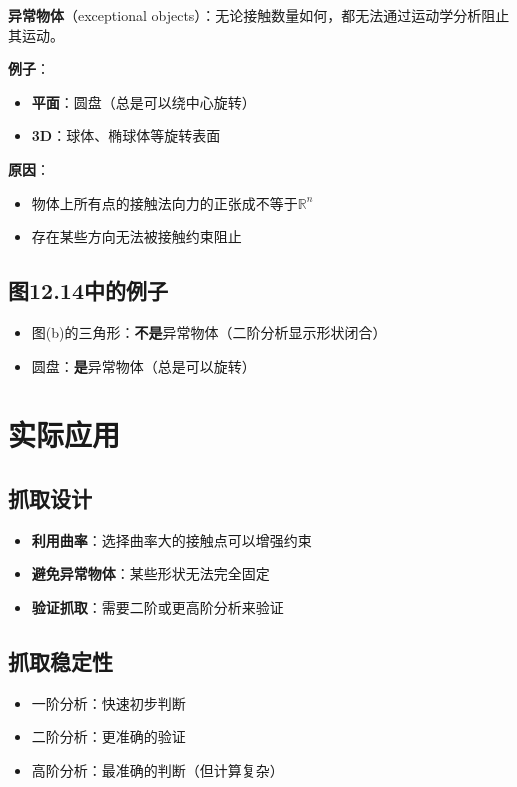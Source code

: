 \documentclass[12pt,a4paper]{article}
\begin{document}
\textbf{异常物体}（exceptional objects）：无论接触数量如何，都无法通过运动学分析阻止其运动。

\textbf{例子}：
\begin{itemize}
\item \textbf{平面}：圆盘（总是可以绕中心旋转）
\item \textbf{3D}：球体、椭球体等旋转表面
\end{itemize}

\textbf{原因}：
\begin{itemize}
\item 物体上所有点的接触法向力的正张成不等于$\mathbb{R}^n$
\item 存在某些方向无法被接触约束阻止
\end{itemize}

\subsection{图12.14中的例子}

\begin{itemize}
\item 图(b)的三角形：\textbf{不是}异常物体（二阶分析显示形状闭合）
\item 圆盘：\textbf{是}异常物体（总是可以旋转）
\end{itemize}

\section{实际应用}

\subsection{抓取设计}

\begin{itemize}
\item \textbf{利用曲率}：选择曲率大的接触点可以增强约束
\item \textbf{避免异常物体}：某些形状无法完全固定
\item \textbf{验证抓取}：需要二阶或更高阶分析来验证
\end{itemize}

\subsection{抓取稳定性}

\begin{itemize}
\item 一阶分析：快速初步判断
\item 二阶分析：更准确的验证
\item 高阶分析：最准确的判断（但计算复杂）
\end{itemize}
\end{document}
